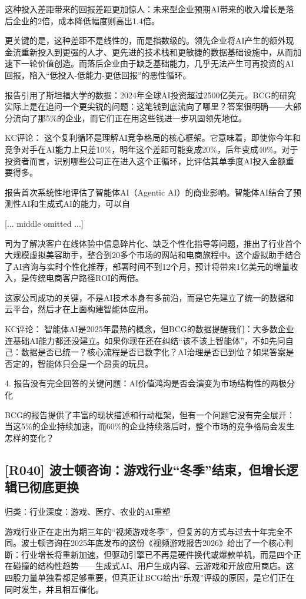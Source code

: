 \documentclass[11pt]{ctexart}
\begin{document}
这种投入差距带来的回报差距更加惊人：未来型企业预期AI带来的收入增长是落后企业的2倍，成本降低幅度则高出1.4倍。

更关键的是，这种差距不是线性的，而是指数级的。领先企业将AI产生的额外现金流重新投入到更强的人才、更先进的技术栈和更敏捷的数据基础设施中，从而加速下一轮价值创造。而落后企业由于缺乏基础能力，几乎无法产生可再投资的AI回报，陷入“低投入-低能力-更低回报”的恶性循环。

报告引用了斯坦福大学的数据：2024年全球AI投资超过2500亿美元。BCG的研究实际上是在追问一个更尖锐的问题：这笔钱到底流向了哪里？答案很明确——大部分流向了那5\%的企业，而它们正在用这些钱进一步巩固领先地位。

KC评论： 这个复利循环是理解AI竞争格局的核心框架。它意味着，即使你今年和竞争对手在AI能力上只差10\%，明年这个差距可能变成20\%，后年变成40\%。对于投资者而言，识别哪些公司正在进入这个正循环，比评估其单季度AI投入金额重要得多。

报告首次系统性地评估了智能体AI（Agentic AI）的商业影响。智能体AI结合了预测性AI和生成式AI的能力，可以自

[... middle omitted ...]

司为了解决客户在线体验中信息碎片化、缺乏个性化指导等问题，推出了行业首个大规模虚拟美容助手，整合到20多个市场的网站和电商旅程中。这个虚拟助手结合了AI咨询与实时个性化推荐，部署时间不到12个月，预计将带来1亿美元的增量收入，是传统电商客户路径ROI的两倍。

这家公司成功的关键，不是AI技术本身有多前沿，而是它先建立了统一的数据和云平台，然后才在上面构建智能体应用。

KC评论： 智能体AI是2025年最热的概念，但BCG的数据提醒我们：大多数企业连基础AI能力都还没建立。如果你现在还在纠结“该不该上智能体”，不如先问自己：数据是否已统一？核心流程是否已数字化？AI治理是否已到位？如果答案是否定的，智能体只会是一个昂贵的玩具。

4. 报告没有完全回答的关键问题：AI价值鸿沟是否会演变为市场结构性的两极分化

BCG的报告提供了丰富的现状描述和行动框架，但有一个问题它没有完全展开：当这5\%的企业持续加速，而60\%的企业持续落后时，整个市场的竞争格局会发生怎样的变化？

\subsection{[R040] 波士顿咨询：游戏行业“冬季”结束，但增长逻辑已彻底更换}
{\small\color{refgray}归类：行业深度：游戏、医疗、农业的AI重塑}

游戏行业正在走出为期三年的“视频游戏冬季”，但复苏的方式与过去十年完全不同。波士顿咨询在2025年底发布的这份《视频游戏报告2026》给出了一个核心判断：行业增长将重新加速，但驱动引擎已不再是硬件换代或爆款单机，而是四个正在碰撞的结构性趋势——生成式AI、用户生成内容、云游戏和开放应用商店。这四股力量单独看都足够重要，但真正让BCG给出“乐观”评级的原因，是它们正在同时发生，并且相互催化。
\end{document}

